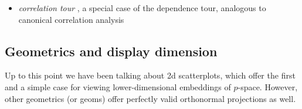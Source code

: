 \documentclass{monashthesis}
\begin{document}
\begin{itemize}
  \begin{itemize}
  \tightlist
  \item
    \emph{correlation tour} \autocite{buja_data_1987}, a special case of
    the dependence tour, analogous to canonical correlation analysis
  \end{itemize}
\end{itemize}

\subsection{Geometrics and display
dimension}\label{geometrics-and-display-dimension}

Up to this point we have been talking about 2d scatterplots, which offer
the first and a simple case for viewing lower-dimensional embeddings of
\(p\)-space. However, other geometrics (or geoms) offer perfectly valid
orthonormal projections as well.
\end{document}
